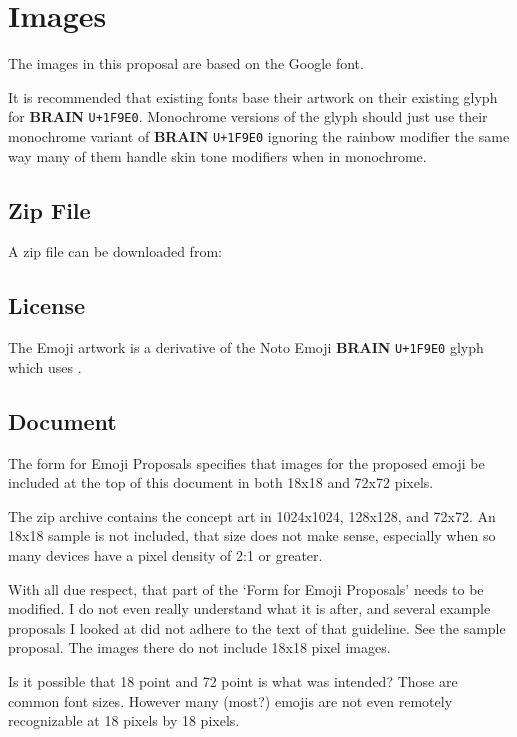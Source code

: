 \section{Images}

The images in this proposal are based on the Google\textsuperscript{\textregistered}  font.

It is recommended that existing fonts base their artwork on their existing glyph for \textbf{BRAIN} \texttt{U+1F9E0}. Monochrome versions of the glyph should just use their monochrome variant of \textbf{BRAIN} \texttt{U+1F9E0} ignoring the rainbow modifier the same way many of them handle skin tone modifiers when in monochrome.

\subsection{Zip File}
A zip file can be downloaded from: 

\subsection{License}

The Emoji artwork is a derivative of the Noto Emoji \textbf{BRAIN} \texttt{U+1F9E0} glyph which uses .

\subsection{Document}

The form for Emoji Proposals specifies that images for the proposed emoji be included at the top of this document in both 18x18 and 72x72 pixels.

The zip archive contains the concept art in 1024x1024, 128x128, and 72x72. An 18x18 sample is not included, that size does not make sense, especially when so many devices have a pixel density of 2:1 or greater.

With all due respect, that part of the `Form for Emoji Proposals' needs to be modified. I do not even really understand what it is after, and several example proposals I looked at did not adhere to the text of that guideline. See the  sample proposal. The images there do not include 18x18 pixel images.

Is it possible that 18 point and 72 point is what was intended? Those are common font sizes. However many (most?) emojis are not even remotely recognizable at 18 pixels by 18 pixels.

